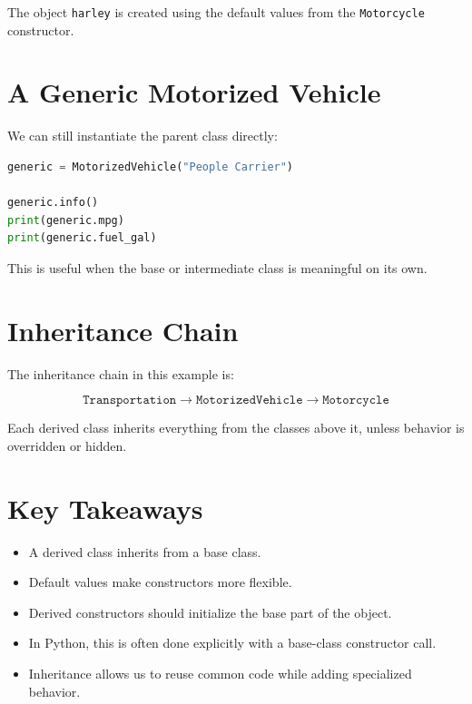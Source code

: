\documentclass[11pt]{article}
\begin{document}
The object \texttt{harley} is created using the default values from the \texttt{Motorcycle} constructor.

\section{A Generic Motorized Vehicle}

We can still instantiate the parent class directly:

\begin{lstlisting}[language=Python]
generic = MotorizedVehicle("People Carrier")

generic.info()
print(generic.mpg)
print(generic.fuel_gal)
\end{lstlisting}

This is useful when the base or intermediate class is meaningful on its own.

\section{Inheritance Chain}

The inheritance chain in this example is:

\[
\texttt{Transportation}
\rightarrow
\texttt{MotorizedVehicle}
\rightarrow
\texttt{Motorcycle}
\]

Each derived class inherits everything from the classes above it, unless behavior is overridden or hidden.

\section{Key Takeaways}

\begin{itemize}
    \item A derived class inherits from a base class.
    \item Default values make constructors more flexible.
    \item Derived constructors should initialize the base part of the object.
    \item In Python, this is often done explicitly with a base-class constructor call.
    \item Inheritance allows us to reuse common code while adding specialized behavior.
\end{itemize}
\end{document}
